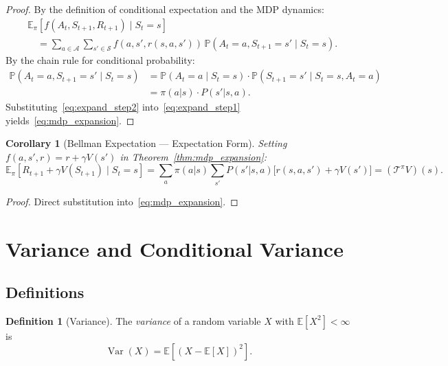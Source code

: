 \documentclass[11pt,a4paper]{article}
\theoremstyle{definition}
\newtheorem{definition}{Definition}[section]
\theoremstyle{plain}
\newtheorem{corollary}[theorem]{Corollary}
\theoremstyle{remark}
\DeclareMathOperator{\Var}{Var}
\newcommand{\E}{\mathbb{E}}
\newcommand{\Prob}{\mathbb{P}}
\begin{document}
\begin{proof}
By the definition of conditional expectation and the MDP dynamics:
\begin{align}
    &\E_\pi[f(A_t, S_{t+1}, R_{t+1}) \mid S_t = s] \nonumber\\
    &\quad= \sum_{a \in \mathcal{A}} \sum_{s' \in \mathcal{S}} f(a, s', r(s,a,s'))\, \Prob(A_t = a, S_{t+1} = s' \mid S_t = s). \label{eq:expand_step1}
\end{align}
By the chain rule for conditional probability:
\begin{align}
    \Prob(A_t = a, S_{t+1} = s' \mid S_t = s)
    &= \Prob(A_t = a \mid S_t = s) \cdot \Prob(S_{t+1} = s' \mid S_t = s, A_t = a) \nonumber\\
    &= \pi(a|s) \cdot P(s'|s,a). \label{eq:expand_step2}
\end{align}
Substituting~\eqref{eq:expand_step2} into~\eqref{eq:expand_step1} yields~\eqref{eq:mdp_expansion}.
\end{proof}

\begin{corollary}[Bellman Expectation --- Expectation Form]
\label{cor:bellman_expansion}
Setting $f(a, s', r) = r + \gamma V(s')$ in Theorem~\ref{thm:mdp_expansion}:
\begin{equation}
    \E_\pi[R_{t+1} + \gamma V(S_{t+1}) \mid S_t = s] = \sum_a \pi(a|s) \sum_{s'} P(s'|s,a)\bigl[r(s,a,s') + \gamma V(s')\bigr] = (\mathcal{T}^\pi V)(s).
    \label{eq:bellman_expansion}
\end{equation}
\end{corollary}

\begin{proof}
Direct substitution into~\eqref{eq:mdp_expansion}.
\end{proof}

\section{Variance and Conditional Variance}
\label{sec:variance}

\subsection{Definitions}
\label{subsec:var_def}

\begin{definition}[Variance]
\label{def:variance}
The \emph{variance} of a random variable $X$ with $\E[X^2] < \infty$ is
\begin{equation}
    \Var(X) = \E\!\left[(X - \E[X])^2\right].
    \label{eq:var_def}
\end{equation}
\end{definition}
\end{document}
